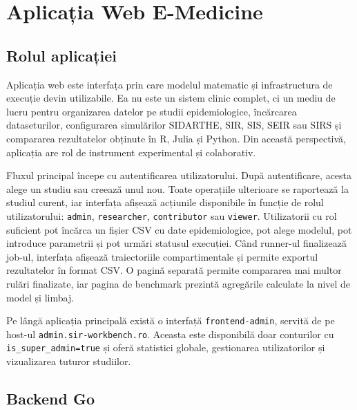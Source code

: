 
\chapter{Aplicația Web E-Medicine}
\label{ch:aplicatie}

\section{Rolul aplicației}
\label{sec:functionalitati}

Aplicația web este interfața prin care modelul matematic și infrastructura de
execuție devin utilizabile. Ea nu este un sistem clinic complet, ci un mediu de
lucru pentru organizarea datelor pe studii epidemiologice, încărcarea
dataseturilor, configurarea simulărilor SIDARTHE, SIR, SIS, SEIR sau SIRS și
compararea rezultatelor obținute în R, Julia și Python. Din această
perspectivă, aplicația are rol de instrument experimental și colaborativ.

Fluxul principal începe cu autentificarea utilizatorului. După autentificare,
acesta alege un studiu sau creează unul nou. Toate operațiile ulterioare se
raportează la studiul curent, iar interfața afișează acțiunile disponibile în
funcție de rolul utilizatorului: \texttt{admin}, \texttt{researcher},
\texttt{contributor} sau \texttt{viewer}. Utilizatorii cu rol suficient pot
încărca un fișier CSV cu date epidemiologice, pot alege modelul, pot introduce
parametrii și pot urmări statusul execuției. Când runner-ul finalizează job-ul,
interfața afișează traiectoriile compartimentale și permite exportul
rezultatelor în format CSV. O pagină separată permite compararea mai multor
rulări finalizate, iar pagina de benchmark prezintă agregările calculate la
nivel de model și limbaj.

Pe lângă aplicația principală există o interfață \texttt{frontend-admin},
servită de pe host-ul \texttt{admin.sir-workbench.ro}. Aceasta este disponibilă doar
conturilor cu \texttt{is\_super\_admin=true} și oferă statistici globale,
gestionarea utilizatorilor și vizualizarea tuturor studiilor.

\section{Backend Go}
\label{sec:backend_go}

